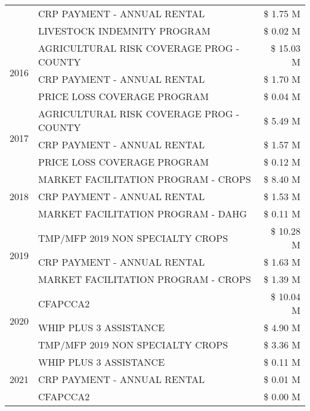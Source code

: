 \begin{tabular}{llr}
 & CRP PAYMENT - ANNUAL RENTAL & \$ 1.75 M \\
 & LIVESTOCK INDEMNITY PROGRAM & \$ 0.02 M \\
\cline{1-3}
\multirow[t]{3}{*}{2016} & AGRICULTURAL RISK COVERAGE PROG - COUNTY & \$ 15.03 M \\
 & CRP PAYMENT - ANNUAL RENTAL & \$ 1.70 M \\
 & PRICE LOSS COVERAGE PROGRAM & \$ 0.04 M \\
\cline{1-3}
\multirow[t]{3}{*}{2017} & AGRICULTURAL RISK COVERAGE PROG - COUNTY & \$ 5.49 M \\
 & CRP PAYMENT - ANNUAL RENTAL & \$ 1.57 M \\
 & PRICE LOSS COVERAGE PROGRAM & \$ 0.12 M \\
\cline{1-3}
\multirow[t]{3}{*}{2018} & MARKET FACILITATION PROGRAM - CROPS & \$ 8.40 M \\
 & CRP PAYMENT - ANNUAL RENTAL & \$ 1.53 M \\
 & MARKET FACILITATION PROGRAM - DAHG & \$ 0.11 M \\
\cline{1-3}
\multirow[t]{3}{*}{2019} & TMP/MFP 2019 NON SPECIALTY CROPS & \$ 10.28 M \\
 & CRP PAYMENT - ANNUAL RENTAL & \$ 1.63 M \\
 & MARKET FACILITATION PROGRAM - CROPS & \$ 1.39 M \\
\cline{1-3}
\multirow[t]{3}{*}{2020} & CFAPCCA2 & \$ 10.04 M \\
 & WHIP PLUS 3 ASSISTANCE & \$ 4.90 M \\
 & TMP/MFP 2019 NON SPECIALTY CROPS & \$ 3.36 M \\
\cline{1-3}
\multirow[t]{3}{*}{2021} & WHIP PLUS 3 ASSISTANCE & \$ 0.11 M \\
 & CRP PAYMENT - ANNUAL RENTAL & \$ 0.01 M \\
 & CFAPCCA2 & \$ 0.00 M \\
\cline{1-3}
\bottomrule
\end{tabular}
